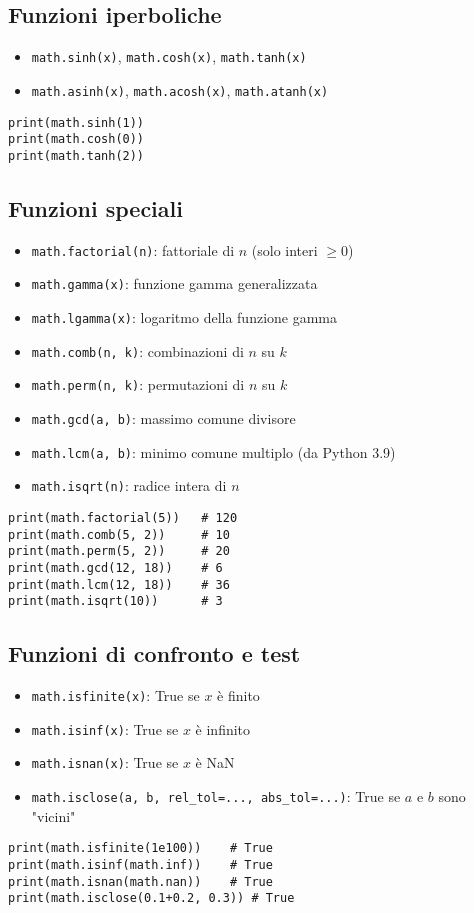 \documentclass[a4paper,12pt]{article}
\begin{document}
\subsection*{Funzioni iperboliche}
\begin{itemize}
    \item \texttt{math.sinh(x)}, \texttt{math.cosh(x)}, \texttt{math.tanh(x)}
    \item \texttt{math.asinh(x)}, \texttt{math.acosh(x)}, \texttt{math.atanh(x)}
\end{itemize}
\begin{lstlisting}
print(math.sinh(1))
print(math.cosh(0))
print(math.tanh(2))
\end{lstlisting}

\subsection*{Funzioni speciali}
\begin{itemize}
    \item \texttt{math.factorial(n)}: fattoriale di $n$ (solo interi $\geq 0$)
    \item \texttt{math.gamma(x)}: funzione gamma generalizzata
    \item \texttt{math.lgamma(x)}: logaritmo della funzione gamma
    \item \texttt{math.comb(n, k)}: combinazioni di $n$ su $k$
    \item \texttt{math.perm(n, k)}: permutazioni di $n$ su $k$
    \item \texttt{math.gcd(a, b)}: massimo comune divisore
    \item \texttt{math.lcm(a, b)}: minimo comune multiplo (da Python 3.9)
    \item \texttt{math.isqrt(n)}: radice intera di $n$
\end{itemize}
\begin{lstlisting}
print(math.factorial(5))   # 120
print(math.comb(5, 2))     # 10
print(math.perm(5, 2))     # 20
print(math.gcd(12, 18))    # 6
print(math.lcm(12, 18))    # 36
print(math.isqrt(10))      # 3
\end{lstlisting}

\subsection*{Funzioni di confronto e test}
\begin{itemize}
    \item \texttt{math.isfinite(x)}: True se $x$ è finito
    \item \texttt{math.isinf(x)}: True se $x$ è infinito
    \item \texttt{math.isnan(x)}: True se $x$ è NaN
    \item \texttt{math.isclose(a, b, rel\_tol=..., abs\_tol=...)}: True se $a$ e $b$ sono "vicini"
\end{itemize}
\begin{lstlisting}
print(math.isfinite(1e100))    # True
print(math.isinf(math.inf))    # True
print(math.isnan(math.nan))    # True
print(math.isclose(0.1+0.2, 0.3)) # True
\end{lstlisting}
\end{document}
